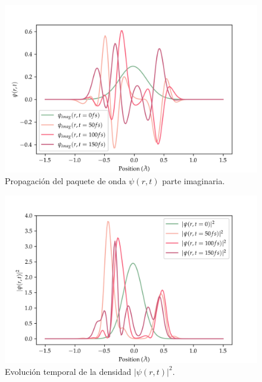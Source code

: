 \begin{figure}[!htbp]
  \centering
  \includegraphics[width=1\textwidth]{./img/psi_ev1real}
  \caption{Propagación del paquete de onda $\psi(r,t)$ parte imaginaria.}
  \label{fig:psi_evim}
\end{figure}

\begin{figure}[!htbp]
  \centering
  \includegraphics[width=1\textwidth]{./img/dens_ev1}
  \caption{Evolución temporal de la densidad $|\psi(r,t)|^2$.}
  \label{fig:dens_ev}
\end{figure}
